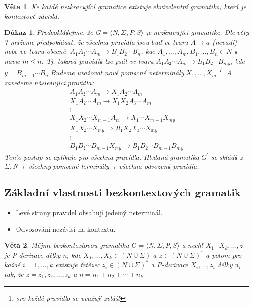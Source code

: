 \documentclass[10pt, a4paper, titlepage]{article}
\theoremstyle{note}
\newtheorem{veta}{\textbf{Věta}}
\newtheorem{dukaz}{\textbf{Důkaz}}
\begin{document}
\begin{veta}
Ke každé nezkracující gramatice existuje ekvivalentní gramatika, která je kontextově \emph{závislá}.
\end{veta}

\begin{dukaz}
Předpokládejme, že $G = \langle N, \Sigma, P, S \rangle$ je nezkracující gramatika. Dle věty 7 můžeme předpokládat, 
že všechna pravidla jsou buď ve tvaru $A \rightarrow a$ (nevadí) nebo ve tvaru obecně. 
$A_{1} A_{2} \cdots A_{m} \rightarrow B_{1} B_{2} \cdots B_{n}$, kde $A_{1}, \ldots,A_{m}, B_{1}, \ldots,B_{n} \in N$ a navíc $m \leq n$. 
Tj. taková pravidla lze psát ve tvaru $A_{1} A_{2} \cdots A_{m} \rightarrow B_{1} B_{2} \cdots B_{my}$, kde $y = B_{m+1} \cdots B_{n}$ 
Budeme uvažovat nové pomocné neterminály $X_{1},...,X_{m}$ \footnote{pro každé pravidlo se uvažují zvlášť}. 
A zavedeme následující pravidla:
\begin{gather*}
A_{1} A_{2} \cdots A_{m} \rightarrow X_{1} A_{2} \cdots A_{m} \\
X_{1} A_{2} \cdots A_{m} \rightarrow X_{1} X_{2} A_{3} \cdots A_{m} \\
\vdots \\
X_{1} X_{2} \cdots X_{m-1} A_{m} \rightarrow X_{1} \cdots X_{m-1} X_{my} \\
X_{1} X_{2} \cdots X_{my} \rightarrow B_{1} X_{2} X_{3} \cdots X_{my} \\
\vdots \\
B_{1} B_{2} \cdots B_{m-1} X_{my} \rightarrow B_{1} B_{2} \cdots B_{m-1}B_{my}
\end{gather*}
Tento postup se aplikuje pro všechna pravidla. Hledaná gramatika $G^{'}$ se skládá z $\Sigma, N$ + všechny pomocné terminály + všechna odvozená pravidla.
\end{dukaz}

\subsection{Základní vlastnosti bezkontextových gramatik}
\begin{itemize}		%
\item
Levé strany pravidel obsahují jedeiný neterminál.

\item
Odvozování nezávisí na kontextu.

\end{itemize}

\begin{veta}
Mějme bezkontextovou gramatiku  $G = \langle N, \Sigma, P, S \rangle$ a nechť $X_{1} \cdots X_{k}, \ldots, z$ 
je P-derivace délky $n$, kde $X_{1}, \ldots, X_{k} \in (N \cup \Sigma)$ a $z \in (N \cup \Sigma)^{*}$ 
a potom pro každé $i = 1, \ldots, k$  existuje řetězec $z_{i} \in (N \cup \Sigma)^{*}$ 
a P-derivace $X_{i}, \ldots, z_{i}$ délky $n_{i}$ tak, že $z = z_{1} ,z_{2}, \ldots, z_{k}$ a $n = n_{1} + n_{2} + \cdots + n_{k}$
\end{veta}
\end{document}
